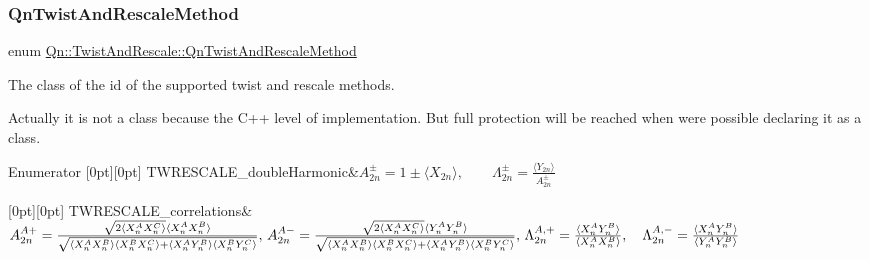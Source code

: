 \subsubsection{\texorpdfstring{Qn\+Twist\+And\+Rescale\+Method}{QnTwistAndRescaleMethod}}
{\footnotesize\ttfamily enum \mbox{\hyperlink{classQn_1_1TwistAndRescale_a04bae5b47174d3536e1f6ac8499b982f}{Qn\+::\+Twist\+And\+Rescale\+::\+Qn\+Twist\+And\+Rescale\+Method}}}



The class of the id of the supported twist and rescale methods. 

Actually it is not a class because the C++ level of implementation. But full protection will be reached when were possible declaring it as a class. \begin{DoxyEnumFields}{Enumerator}
[0pt][0pt]{}\mbox{\label{classQn_1_1TwistAndRescale_a04bae5b47174d3536e1f6ac8499b982fade06f7c20fc674951b236bbfb0012a6a}} 
T\+W\+R\+E\+S\+C\+A\+L\+E\+\_\+double\+Harmonic&$ A^{\pm}_{2n} = 1 \pm \langle X_{2n} \rangle, \qquad \Lambda ^{\pm}_{2n} = \frac{\langle Y_{2n} \rangle}{A^{\pm}_{2n}} $ \\
\hline

[0pt][0pt]{}\mbox{\label{classQn_1_1TwistAndRescale_a04bae5b47174d3536e1f6ac8499b982fad0d9e217f4cd21ef50a93fa165d235d4}} 
T\+W\+R\+E\+S\+C\+A\+L\+E\+\_\+correlations&$ A^{A+}_{2n} = \frac{\sqrt{2 \langle X^{A}_{n} X^{C}_{n} \rangle}\langle X^{A}_{n} X^{B}_{n} \rangle} {\sqrt{\langle X^{A}_{n} X^{B}_{n} \rangle \langle X^{B}_{n} X^{C}_{n} \rangle + \langle X^{A}_{n} Y^{B}_{n} \rangle \langle X^{B}_{n} Y^{C}_{n} \rangle}}, \\ \, A^{A-}_{2n} = \frac{\sqrt{2 \langle X^{A}_{n} X^{C}_{n} \rangle}\langle Y^{A}_{n} Y^{B}_{n} \rangle} {\sqrt{\langle X^{A}_{n} X^{B}_{n} \rangle \langle X^{B}_{n} X^{C}_{n} \rangle + \langle X^{A}_{n} Y^{B}_{n} \rangle \langle X^{B}_{n} Y^{C}_{n} \rangle}}, \\ \, \Lambda^{A,+}_{2n} = \frac{\langle X^{A}_{n} Y^{B}_{n} \rangle}{\langle X^{A}_{n} X^{B}_{n} \rangle}, \quad \Lambda^{A,-}_{2n} = \frac{\langle X^{A}_{n} Y^{B}_{n} \rangle}{\langle Y^{A}_{n} Y^{B}_{n} \rangle} $ \\
\hline

\end{DoxyEnumFields}


